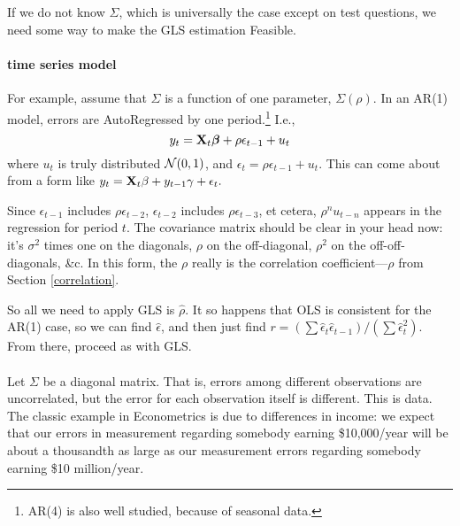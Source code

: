 \subsection{} 

If we do not know $\Sigma$, which is universally the case except on
test questions, we need some way to make the GLS estimation Feasible. 

\label{ts}
\paragraph{ time series model}
For example, assume that $\Sigma$ is a function of one parameter, $\Sigma(\rho)$.  
In an AR(1) model, errors are AutoRegressed by one period.\footnote{AR(4) is
also well studied, because of seasonal data.} I.e.,
$$y_t={\bf X}_t{\mbox{\boldmath$\beta$}} + \rho\epsilon_{t-1} + u_t$$
where $u_t$ is truly distributed ${\cal N}(0,1)$, and $\epsilon_t=
\rho\epsilon_{t-1} + u_t$. This can come about from  a form like
$y_t={\bf X}_t\beta + y_{t-1}\gamma + \epsilon_t.$


Since $\epsilon_{t-1}$ includes $\rho\epsilon_{t-2}$, 
$\epsilon_{t-2}$ includes $\rho\epsilon_{t-3}$, et cetera,
$\rho^n u_{t-n}$
appears in the regression for period $t$. The covariance matrix should
be clear in your head now: it's $\sigma^2$ times one on the diagonals,
$\rho$ on the off-diagonal, $\rho^2$ on the off-off-diagonals, \&c. In
this form, the $\rho$ really is the correlation coefficient---$\rho$
from Section \ref{correlation}.

So all we need to apply GLS is $\hat\rho$. It so happens that OLS is
consistent for the AR(1) case, so we can find $\hat\epsilon$, and then
just find $r=(\sum \hat\epsilon_t \hat\epsilon_{t-1})/(\sum
\hat\epsilon_t^2)$. From there, proceed as with GLS.


\paragraph{}
Let $\Sigma$ be a diagonal matrix. That is, errors among different
observations are uncorrelated, but the error for each observation itself
is different. This is  data. The classic example
in Econometrics is due to differences in income: we expect that our
errors in measurement regarding somebody earning \$10,000/year will be
about a thousandth as large as our measurement errors regarding somebody
earning \$10 million/year.


